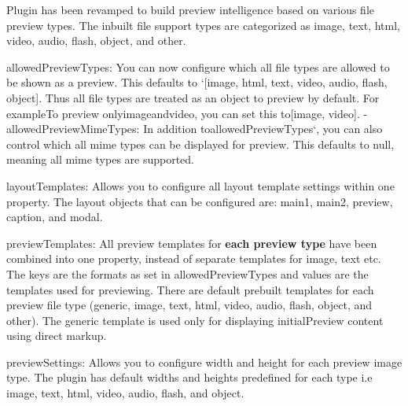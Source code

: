 \begin{DoxyItemize}
\item Plugin has been revamped to build preview intelligence based on various file preview types. The inbuilt file support types are categorized as {\ttfamily image}, {\ttfamily text}, {\ttfamily html}, {\ttfamily video}, {\ttfamily audio}, {\ttfamily flash}, {\ttfamily object}, and {\ttfamily other}.
\item {\ttfamily allowed\+Preview\+Types}\+: You can now configure which all file types are allowed to be shown as a preview. This defaults to `\mbox{[}\textquotesingle{}image\textquotesingle{}, \textquotesingle{}html\textquotesingle{}, \textquotesingle{}text\textquotesingle{}, \textquotesingle{}video\textquotesingle{}, \textquotesingle{}audio\textquotesingle{}, \textquotesingle{}flash\textquotesingle{}, \textquotesingle{}object\textquotesingle{}\mbox{]}{\ttfamily . Thus all file types are treated as an object to preview by default. For example\+To preview only}image{\ttfamily and}video{\ttfamily , you can set this to}\mbox{[}\textquotesingle{}image\textquotesingle{}, \textquotesingle{}video\textquotesingle{}\mbox{]}{\ttfamily . -\/}allowed\+Preview\+Mime\+Types{\ttfamily \+: In addition to}allowed\+Preview\+Types`, you can also control which all mime types can be displayed for preview. This defaults to null, meaning all mime types are supported.
\item {\ttfamily layout\+Templates}\+: Allows you to configure all layout template settings within one property. The layout objects that can be configured are\+: {\ttfamily main1}, {\ttfamily main2}, {\ttfamily preview}, {\ttfamily caption}, and {\ttfamily modal}.
\item {\ttfamily preview\+Templates}\+: All preview templates for {\bfseries each preview type} have been combined into one property, instead of separate templates for image, text etc. The keys are the formats as set in {\ttfamily allowed\+Preview\+Types} and values are the templates used for previewing. There are default prebuilt templates for each preview file type ({\ttfamily generic}, {\ttfamily image}, {\ttfamily text}, {\ttfamily html}, {\ttfamily video}, {\ttfamily audio}, {\ttfamily flash}, {\ttfamily object}, and {\ttfamily other}). The {\ttfamily generic} template is used only for displaying {\ttfamily initial\+Preview} content using direct markup.
\item {\ttfamily preview\+Settings}\+: Allows you to configure width and height for each preview image type. The plugin has default widths and heights predefined for each type i.\+e {\ttfamily image}, {\ttfamily text}, {\ttfamily html}, {\ttfamily video}, {\ttfamily audio}, {\ttfamily flash}, and {\ttfamily object}.

\end{DoxyItemize}
